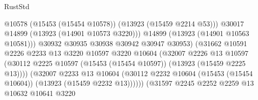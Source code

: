 \begin{lexlean}{RustStd}
\begin{coremodule}
                                                @10578
                                                (@15453 (@15454 @10578))
                                                (@13923 (@15459 @2214 @53)))
                                              @30017
                                              @14899
                                              (@13923 (@14901 @10573 @3220)))
                                            @14899
                                            (@13923 (@14901 @10563 @10581)))
                                          @30932
                                          @30935
                                          @30938
                                          @30942
                                          @30947
                                          @30953)
                                        (@31662
                                          @10591
                                          @2226
                                          @2233
                                          @13
                                          @3220
                                          @10597
                                          @3220
                                          @10604
                                          (@32007
                                            @2226
                                            @13
                                            @10597
                                            (@30112
                                              @2225
                                              @10597
                                              (@15453 (@15454 @10597))
                                              (@13923 (@15459 @2225 @13))))
                                          (@32007
                                            @2233
                                            @13
                                            @10604
                                            (@30112
                                              @2232
                                              @10604
                                              (@15453 (@15454 @10604))
                                              (@13923 (@15459 @2232 @13))))))
                                      (@31597
                                        @2245
                                        @2252
                                        @2259
                                        @13
                                        @10632
                                        @10641
                                        @3220

\end{coremodule}
\end{lexlean}
